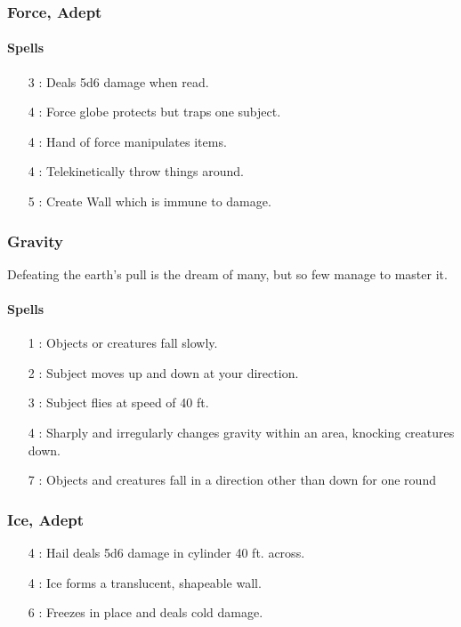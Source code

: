 \subsubsection{Force, Adept}
\paragraph{Spells}
\begin{itemize}
 \item[3] : Deals 5d6 damage when read.
 \item[4] : Force globe protects but traps one subject.
 \item[4] : Hand of force manipulates items.
 \item[4] : Telekinetically throw things around.
 \item[5] : Create Wall which is immune to damage.
\end{itemize}

\subsubsection{Gravity}
Defeating the earth's pull is the dream of many, but so few manage to master it.
\paragraph{Spells}
\begin{itemize}
 \item[1] : Objects or creatures fall slowly.
 \item[2] : Subject moves up and down at your direction.
 \item[3] : Subject flies at speed of 40 ft.
 \item[4] : Sharply and irregularly changes gravity within an area, knocking creatures down.
 \item[7] : Objects and creatures fall in a direction other than down for one round
\end{itemize}

\subsubsection{Ice, Adept}
\begin{itemize}
 \item[4] : Hail deals 5d6 damage in cylinder 40 ft. across.
 \item[4] : Ice forms a translucent, shapeable wall.
 \item[6] : Freezes in place and deals cold damage.
\end{itemize}


